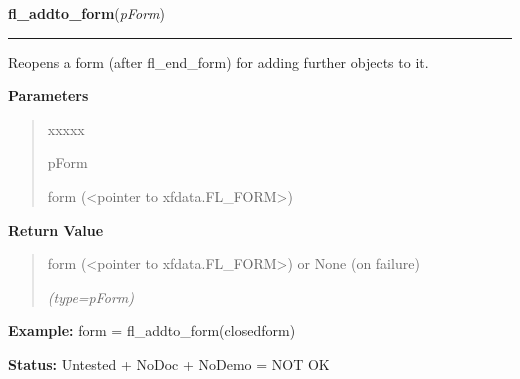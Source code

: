     \label{xformslib:library:fl_addto_form}

    \vspace{0.5ex}

\hspace{.8\funcindent}\begin{boxedminipage}{\funcwidth}

    \raggedright \textbf{fl\_addto\_form}(\textit{pForm})

    \vspace{-1.5ex}

    \rule{\textwidth}{0.5\fboxrule}
\setlength{\parskip}{2ex}
    Reopens a form (after fl\_end\_form) for adding further objects to it.

\setlength{\parskip}{1ex}
      \textbf{Parameters}
      \vspace{-1ex}

      \begin{quote}
        \begin{Ventry}{xxxxx}

          \item[pForm]

          form ({\textless}pointer to xfdata.FL\_FORM{\textgreater})

        \end{Ventry}

      \end{quote}

      \textbf{Return Value}
    \vspace{-1ex}

      \begin{quote}
      form ({\textless}pointer to xfdata.FL\_FORM{\textgreater}) or None 
      (on failure)

      {\it (type=pForm)}

      \end{quote}

\textbf{Example:} form = fl\_addto\_form(closedform)



\textbf{Status:} Untested + NoDoc + NoDemo = NOT OK



    \end{boxedminipage}

    \label{xformslib:library:fl_make_object}

